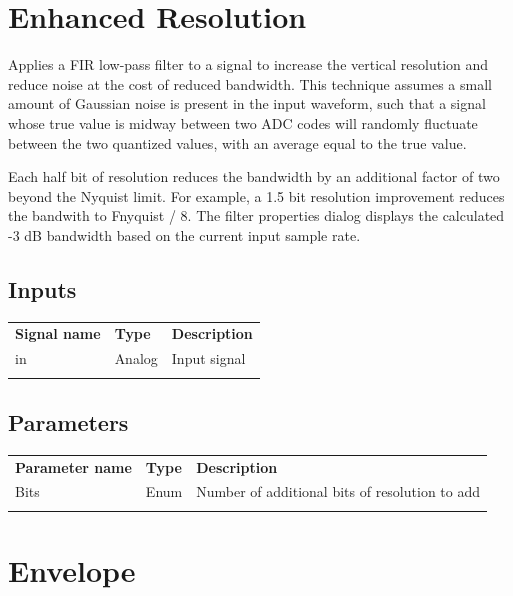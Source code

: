 \section{Enhanced Resolution}
\label{filter:eres}

Applies a FIR low-pass filter to a signal to increase the vertical resolution and reduce noise at the cost of reduced
bandwidth. This technique assumes a small amount of Gaussian noise is present in the input waveform, such that a signal
whose true value is midway between two ADC codes will randomly fluctuate between the two quantized values, with an
average equal to the true value.

Each half bit of resolution reduces the bandwidth by an additional factor of two beyond the Nyquist limit. For example,
a 1.5 bit resolution improvement reduces the bandwith to Fnyquist / 8. The filter properties dialog displays the
calculated -3 dB bandwidth based on the current input sample rate.

\subsection{Inputs}

\begin{tabularx}{16cm}{llX}
\thickhline
\textbf{Signal name} & \textbf{Type} & \textbf{Description} \\
\thickhline
in & Analog & Input signal\\
\thickhline
\end{tabularx}

\subsection{Parameters}

\begin{tabularx}{16cm}{llX}
\thickhline
\textbf{Parameter name} & \textbf{Type} & \textbf{Description} \\
\thickhline
Bits & Enum & Number of additional bits of resolution to add\\
\thickhline
\end{tabularx}

\pagebreak
\section{Envelope}
\label{filter:envelope}

